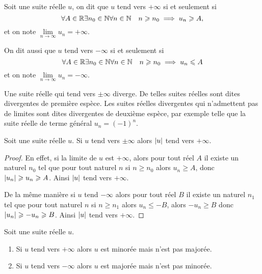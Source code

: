 \begin{defdef}
  Soit une suite réelle \(u\), on dit que \(u\) tend vers \(+\infty\) si et seulement si
  \begin{equation}
    \forall A \in \mathbb{R} \exists n_0 \in \mathbb{N} \forall n \in \mathbb{N} \quad n \geqslant n_0 \implies u_n \geqslant A,
  \end{equation}
  et on note \(\lim\limits_{n\to\infty}u_n=+\infty\). 

  On dit aussi que \(u\) tend vers \(-\infty\) si et seulement si
  \begin{equation}
    \forall A \in \mathbb{R} \exists n_0 \in \mathbb{N} \forall n \in \mathbb{N} \quad n \geqslant n_0 \implies u_n \leqslant A
  \end{equation}
  et on note \(\lim\limits_{n\to\infty}u_n=-\infty\).
\end{defdef}
Une suite réelle qui tend vers \(\pm\infty\) diverge. De telles suites réelles sont dites divergentes de première espèce. Les suites réelles divergentes qui n'admettent pas de limites sont dites divergentes de deuxième espèce, par exemple telle que la suite réelle de terme général \(u_n=(-1)^n\).
\begin{prop}
  Soit une suite réelle \(u\). Si \(u\) tend vers \(\pm\infty\) alors \(\left\lvert u\right\rvert\) tend vers \(+\infty\).
\end{prop}
\begin{proof}
  En effet, si la limite de \(u\) est \(+\infty\), alors pour tout réel \(A\) il existe un naturel \(n_0\)  tel que pour tout naturel \(n\) si \(n \geqslant n_0\) alors \(u_n \geqslant A\), donc \(\left\lvert u_n\right\rvert \geqslant u_n \geqslant A\). Ainsi \(\left\lvert u\right\rvert\) tend vers \(+\infty\). 

  De la même manière si \(u\) tend \(-\infty\) alors  pour tout réel \(B\) il existe un naturel \(n_1\)  tel que pour tout naturel \(n\) si \(n \geqslant n_1\) alors \(u_n \leqslant -B\), alors \(-u_n \geqslant B\) donc \(\left\lvert u_n\right\rvert \geqslant -u_n \geqslant B\). Ainsi \(\left\lvert u\right\rvert\) tend vers \(+\infty\). 
\end{proof}
\begin{prop}
  Soit une suite réelle \(u\).
  \begin{enumerate}
  \item Si \(u\) tend vers \(+\infty\) alors \(u\) est minorée mais n'est pas majorée.
  \item Si \(u\) tend vers \(-\infty\) alors \(u\) est majorée mais n'est pas minorée.
  \end{enumerate}
\end{prop}

